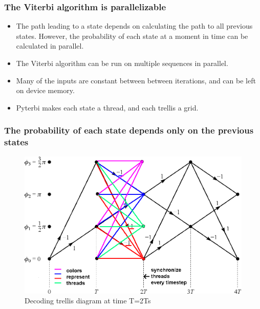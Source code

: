 \documentclass{beamer}
\begin{document}
    \begin{frame}
        \frametitle{The Viterbi algorithm is parallelizable}
        
        \begin{itemize}
            \item The path leading to a state depends on calculating the path to all previous states. However, the probability of each state at a moment in time can be calculated in parallel.
            \item The Viterbi algorithm can be run on multiple sequences in parallel.
            \item Many of the inputs are constant between between iterations, and can be left on device memory.
            \item Pyterbi makes each state a thread, and each trellis a grid.
        \end{itemize} 
    \end{frame}
    
    \begin{frame}
        \frametitle{The probability of each state depends only on the previous states}
        \begin{figure}
            \includegraphics[width=.8\textwidth]{figures/cpmfulltrelliscolored.png}
            \caption{Decoding trellis diagram at time T=2Ts}
        \end{figure}
    \end{frame}
   
\end{document}
